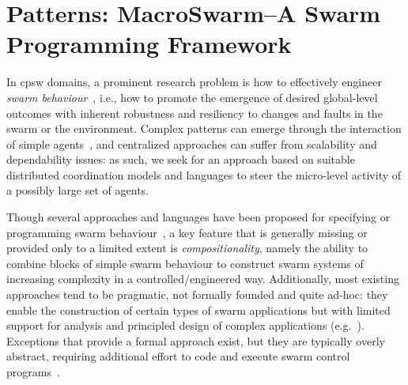 %
\newcommand{\MacroSwarm}{{\sc{}MacroSwarm}}

\chapter[Patterns: MacroSwarm]{Patterns: MacroSwarm--A Swarm Programming Framework}\label{chap:eng:macroswarm}%
\minitoc%
%
In \ac{cpsw} domains,
 a prominent research problem
 is how to effectively engineer \emph{swarm behaviour}~\cite{DBLP:journals/swarm/BrambillaFBD13},
 i.e., how to promote 
 the emergence of desired global-level outcomes %
 with inherent robustness and resiliency to changes and faults in the swarm or the environment.
%
Complex patterns can emerge through the interaction of simple agents~\cite{bonabeau1999swarmintelligence-book}, and centralized approaches %
 can suffer from scalability and dependability issues: as such,  
 we seek for an approach based on %
 suitable distributed coordination models and languages to steer the micro-level activity of a possibly large set of agents.
%
 
%
Though several approaches and languages have been proposed 
 for specifying or programming swarm behaviour~\cite{Meld2007,%
DBLP:conf/icra/CarrollNS21,%
paros,%
DBLP:conf/isola/KosakHBWHR20,%
Koutsoubelias2016tecola,%
lima2018dolphin,%
Mottola2014voltron,%
DBLP:conf/iros/PinciroliB16,%
DBLP:conf/iros/YiDLD0WY20},
 a key feature that is generally missing or provided only to a limited extent
 is \emph{compositionality},
 namely the ability to combine blocks of simple swarm behaviour to construct swarm systems of increasing complexity in a controlled/engineered way.
%
Additionally, most existing approaches tend to be pragmatic, not formally founded and quite ad-hoc: 
 they enable the construction of certain types of swarm applications
 but with limited support for analysis and principled design of complex applications 
 (e.g.~\cite{lima2018dolphin,paros,DBLP:conf/iros/PinciroliB16,DBLP:conf/icra/CarrollNS21}).
%
Exceptions that provide a formal approach exist, 
 but they are typically overly abstract, 
 requiring additional effort to code and execute swarm control programs~\cite{DBLP:journals/csur/LuckcuckFDDF19}.

